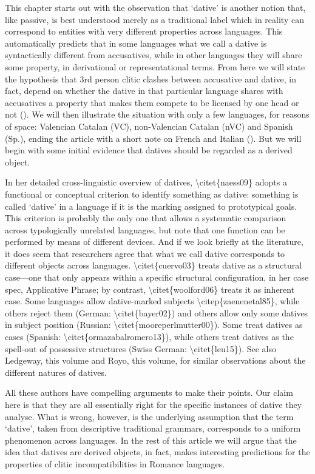 \documentclass[output=paper,modfonts,nonflat]{langsci/langscibook}
\begin{document}
This chapter starts out with the observation that ‘dative’ is another notion that, like passive, is best understood merely as a traditional label which in reality can correspond to entities with very different properties across languages. This automatically predicts that in some languages what we call a dative is syntactically different from accusatives, while in other languages they will share some property, in derivational or representational terms. From here we will state the hypothesis that 3rd person clitic clashes between accusative and dative, in fact, depend on whether the dative in that particular language shares with accusatives a property that makes them compete to be licensed by one head or not (). We will then illustrate the situation with only a few languages, for reasons of space: Valencian Catalan (VC), non-Valencian Catalan (nVC) and Spanish (Sp.), ending the article with a short note on French and Italian (). But we will begin with some initial evidence that datives should be regarded as a derived object.

In her detailed cross-linguistic overview of datives, {\textbackslash}citet\{naess09\} adopts a functional or conceptual criterion to identify something as dative: something is called ‘dative’ in a language if it is the marking assigned to prototypical goals. This criterion is probably the only one that allows a systematic comparison across typologically unrelated languages, but note that one function can be performed by means of different devices. And if we look briefly at the literature, it does seem that researchers agree that what we call dative corresponds to different objects across languages. {\textbackslash}citet\{cuervo03\} treats dative as a structural case—one that only appears within a specific structural configuration, in her case spec, Applicative Phrase; by contrast, {\textbackslash}citet\{woolford06\} treats it as inherent case. Some languages allow dative-marked subjects {\textbackslash}citep\{zaenenetal85\}, while others reject them (German: {\textbackslash}citet\{bayer02\}) and others allow only some datives in subject position (Russian: {\textbackslash}citet\{mooreperlmutter00\}). Some treat datives as cases (Spanish: {\textbackslash}citet\{ormazabalromero13\}), while others treat datives as the spell-out of possessive structures (Swiss German: {\textbackslash}citet\{leu15\}). See also Ledgeway, this volume and Royo, this volume, for similar observations about the different natures of datives.

All these authors have compelling arguments to make their points. Our claim here is that they are all essentially right for the specific instances of dative they analyse. What is wrong, however, is the underlying assumption that the term ‘dative’, taken from descriptive traditional grammars, corresponds to a uniform phenomenon across languages. In the rest of this article we will argue that the idea that datives are derived objects, in fact, makes interesting predictions for the properties of clitic incompatibilities in Romance languages.
\end{document}
